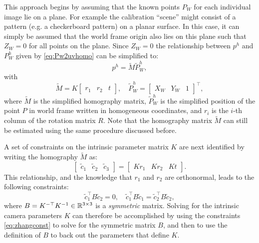 This approach begins by assuming that the known points $P_W$ for each individual image lie on a plane. For example the calibration ``scene'' might consist of a pattern (e.g. a checkerboard pattern) on a planar surface. In this case, it can simply be assumed that the world frame origin also lies on this plane such that $Z_W = 0$ for all points on the plane. Since $Z_W = 0$ the relationship between $p^h$ and $P^h_W$ given by \eqref{eq:Pw2uvhomo} can be simplified to:
\begin{equation}
p^h = \tilde{M} \tilde{P}_W^h,
\end{equation}
with
\begin{equation}
    \tilde{M} = K\begin{bmatrix}
    r_1 & r_2 & t
\end{bmatrix}, \quad \tilde{P}_W^h = \begin{bmatrix}
    X_W & Y_W & 1
\end{bmatrix}^\top ,
\end{equation}
where $\tilde{M}$ is the simplified homography matrix, $\tilde{P}_W^h$ is the simplified position of the point $P$ in world frame written in homogeneous coordinates, and $r_i$ is the $i$-th column of the rotation matrix $R$. Note that the homography matrix $\tilde{M}$ can still be estimated using the same procedure discussed before.

A set of constraints on the intrinsic parameter matrix $K$ are next identified by writing the homography $\tilde{M}$ as:
\begin{equation*}
    \begin{bmatrix}
        \tilde{c}_1 & \tilde{c}_2 & \tilde{c}_3
        \end{bmatrix} = \begin{bmatrix}
        Kr_1 & Kr_2 & Kt
    \end{bmatrix}.
\end{equation*}
This relationship, and the knowledge that $r_1$ and $r_2$ are orthonormal, leads to the following constraints:
\begin{equation} \label{eq:zhangconst}
    \tilde{c}_1^\top  B \tilde{c}_2 = 0, \quad \tilde{c}_1^\top  B \tilde{c}_1 = \tilde{c}_2^\top  B \tilde{c}_2,
\end{equation}
where $B = K^{-\top}K^{-1} \in \mathbb{R}^{3 \times 3}$ is a \textit{symmetric} matrix. Solving for the intrinsic camera parameters $K$ can therefore be accomplished by using the constraints \eqref{eq:zhangconst} to solve for the symmetric matrix $B$, and then to use the definition of $B$ to back out the parameters that define $K$.

